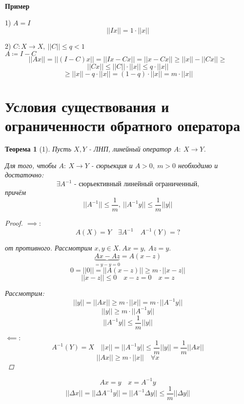 \documentclass[a4paper]{article}
\newtheorem*{theorem}{Теорема}
\theoremstyle{definition}
\theoremstyle{remark}
\begin{document}
\textbf{Пример}

1) $ A = I $
\[
    ||Ix|| = 1 \cdot ||x||
\]

2) $ C: X \to X, \ ||C|| \leq q < 1 $\\
$ A \coloneq I - C $ 
\[
    ||Ax|| = ||(I - C)x|| = ||Ix - Cx|| = ||x - Cx|| \geq ||x|| - ||Cx|| \geq
\]
\[
    ||Cx|| \leq ||C|| \cdot ||x|| \leq q \cdot ||x||
\]
\[
    \geq ||x|| - q \cdot ||x|| = (1 - q) \cdot ||x|| = m \cdot ||x||
\]

\section*{\centering Условия существования и ограниченности обратного оператора}
\begin{tcolorbox}
\begin{theorem}[1]
    Пусть $ X,Y $ - ЛНП, линейный оператор $ A: \ X \to Y $.

    Для того, чтобы $ A: \ X \to Y $ - сюрьекция и $ A > 0, \ m > 0 $
    необходимо и достаточно:
    \[
        \exists A^{-1} \text{ - сюрьективный линейный ограниченный,}
    \]
    причём
    \[
        ||A^{-1}|| \leq \frac{1}{m}, \ ||A^{-1} y|| \leq \frac{1}{m} ||y|| 
    \]

    \begin{proof}
        $ \implies: $ 
        \[
            A(X) = Y \quad \exists A^{-1} \quad A^{-1}(Y) = ?
        \]

        от противного. Рассмотрим $ x,y \in X. \ Ax = y, \ Az = y. $ 
        \[
            \underbrace{Ax-Az}_{=y-y=0} = A(x-z)
        \]
        \[
            0 = ||0|| = ||A(x-z)|| \geq m \cdot ||x-z||
        \]
        \[
            ||x-z|| \leq 0 \quad x - z = 0 \quad x = z
        \]

        Рассмотрим:
        \[
            ||y|| = ||Ax|| \geq m \cdot ||x|| = m \cdot ||A^{-1} y||
        \]
        \[
            ||y|| \geq m \cdot ||A^{-1} y||
        \]
        \[
            ||A^{-1} y|| \leq \frac{1}{m} ||y||
        \]

        $ \impliedby: $ 
        \[
            A^{-1}(Y) = X \quad ||x|| = ||A^{-1} y|| \leq \frac{1}{m} ||y||
            = \frac{1}{m} ||Ax||
        \]
        \[
            ||Ax|| \geq m \cdot ||x|| \quad \forall x
        \]
    \end{proof}
\end{theorem}
\end{tcolorbox}

\[
    Ax = y \quad x = A^{-1} y
\]
\[
    ||\Delta x|| = ||\Delta A^{-1} y|| = ||A^{-1} \Delta y|| \leq \frac{1}{m} 
    ||\Delta y||
\]
\end{document}
